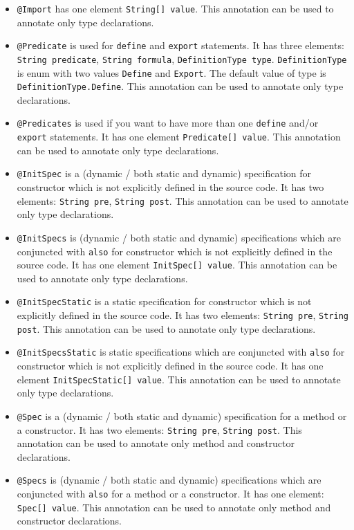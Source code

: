 \documentclass{article}
\begin{document}
\begin{itemize}
\item \texttt{@Import} has one element \texttt{String[] value}. This annotation can be used to annotate only type declarations.
\item \texttt{@Predicate} is used for \texttt{define} and \texttt{export} statements. It has three elements: \texttt{String predicate}, \texttt{String formula}, \texttt{DefinitionType type}. \texttt{DefinitionType} is enum with two values \texttt{Define} and \texttt{Export}.  The default value of type is \texttt{DefinitionType.Define}. This annotation can be used to annotate only type declarations.
\item \texttt{@Predicates} is used if you want to have more than one  \texttt{define} and/or \texttt{export} statements. It has one element \texttt{Predicate[] value}. This annotation can be used to annotate only type declarations.
\item \texttt{@InitSpec} is a (dynamic / both static and dynamic) specification for constructor which is not explicitly defined in the source code. It has two elements: \texttt{String pre}, \texttt{String post}. This annotation can be used to annotate only type declarations.
\item \texttt{@InitSpecs} is (dynamic / both static and dynamic) specifications which are conjuncted with \texttt{also} for constructor which is not explicitly defined in the source code. It has one element \texttt{InitSpec[] value}. This annotation can be used to annotate only type declarations.
\item \texttt{@InitSpecStatic} is a static specification for constructor which is not explicitly defined in the source code. It has two elements: \texttt{String pre}, \texttt{String post}. This annotation can be used to annotate only type declarations.
\item \texttt{@InitSpecsStatic} is static specifications which are conjuncted with \texttt{also} for constructor which is not explicitly defined in the source code. It has one element \texttt{InitSpecStatic[] value}. This annotation can be used to annotate only type declarations.
\item \texttt{@Spec} is a (dynamic / both static and dynamic) specification for a method or a constructor. It has two elements: \texttt{String pre}, \texttt{String post}. This annotation can be used to annotate only method and constructor declarations.
\item \texttt{@Specs} is (dynamic / both static and dynamic) specifications which are conjuncted with \texttt{also} for a method or a constructor. It has one element: \texttt{Spec[] value}. This annotation can be used to annotate only method and constructor declarations.

\end{itemize}
\end{document}
